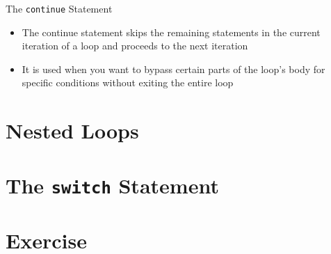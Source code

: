 \documentclass[12pt, aspectratio=169]{beamer}
\begin{document}


    \begin{frame}{The \texttt{continue} Statement}
        \begin{itemize}
            \item The continue statement skips the remaining statements in the current iteration of a loop and proceeds to the next iteration
            \item It is used when you want to bypass certain parts of the loop's body for specific conditions without exiting the entire loop
        \end{itemize}
    \end{frame}




    \section{Nested Loops}


    \section{The \texttt{switch} Statement}


    \section{Exercise}
\end{document}
